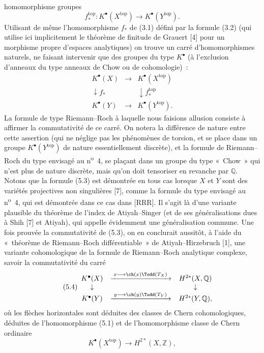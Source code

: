 homomorphisme groupes
\begin{equation}\tag{5.2}
f^{\mathrm{top}}_*:K^\bullet(X^{\mathrm{top}})\longrightarrow K^\bullet(Y^{\mathrm{top}}).
\end{equation}
Utilisant de m\^eme l'homomorphisme $f_*$ de (3.1) d\'efini par la formule (3.2) (qui utilise ici implicitement le th\'eor\`eme de finitude de Grauert [4] pour un morphisme propre d'espaces analytiques) on trouve un carr\'e d'homomorphismes naturels, ne faisant intervenir que des groupes du type $K^\bullet$ (\`a l'exclusion d'anneaux du type anneaux de Chow ou de cohomologie)~:
\begin{equation}\tag{5.3}
\begin{array}{ccc}
K^\bullet(X) & \longrightarrow & K^\bullet(X^{\mathrm{top}}) \\
\downarrow f_* && \downarrow f^{\mathrm{top}}_* \\
K^\bullet(Y) & \longrightarrow & K^\bullet(Y^{\mathrm{top}}).
\end{array}
\end{equation}
La formule de type Riemann--Roch \`a laquelle nous faisions allusion consiste \`a affirmer la commutativit\'e de ce carr\'e. On notera la diff\'erence de nature entre cette assertion (qui ne n\'eglige pas les ph\'enom\`enes de torsion, et se place dans un groupe $K^\bullet(Y^{\mathrm{top}})$ de nature essentiellement discr\`ete), et la formule de Riemann--Roch du type envisag\'e au n\textsuperscript{o}~4, se pla\c{c}ant dans un groupe du type «~Chow~» qui n'est plus de nature discr\`ete, mais qu'on doit tensoriser en revanche par $\mathbb Q$. Notons que la formule (5.3) est d\'emontr\'ee en tous cas lorsque $X$ et $Y$ sont des vari\'et\'es projectives non singuli\`eres [7], comme la formule du type envisag\'e au n\textsuperscript{o}~4, qui est d\'emontr\'ee dans ce cas dans [RRR]. Il s'agit l\`a d'une variante plausible du th\'eor\`eme de l'index de Atiyah--Singer (et de ses g\'en\'eralisations dues \`a Shih [7] et Atiyah), qui appelle \'evidemment une g\'en\'eralisation commune. Une fois prouv\'ee la commutativit\'e de (5.3), on en conclurait aussit\^ot, \`a l'aide du «~th\'eor\`eme de Riemann--Roch diff\'erentiable~» de Atiyah--Hirzebruch [1], une variante cohomologique de la formule de Riemann--Roch analytique complexe, savoir la commutativit\'e du carr\'e
\begin{equation}\tag{5.4}
\begin{array}{ccc}
K^\bullet(X) & \xrightarrow{\;x\longrightarrow \ch(x)\Todd(T_X)\;} & H^{2*}(X,\mathbb Q) \\
\downarrow && \downarrow \\
K^\bullet(Y) & \xrightarrow{\;y\longrightarrow \ch(y)\Todd(T_Y)\;} & H^{2*}(Y,\mathbb Q),
\end{array}
\end{equation}
o\`u les fl\`eches horizontales sont d\'eduites des classes de Chern cohomologiques, d\'eduites de l'homomorphisme (5.1) et de l'homomorphisme classe de Chern ordinaire
\[
K^\bullet(X^{\mathrm{top}})\longrightarrow H^{2*}(X,\mathbb Z),
\]

